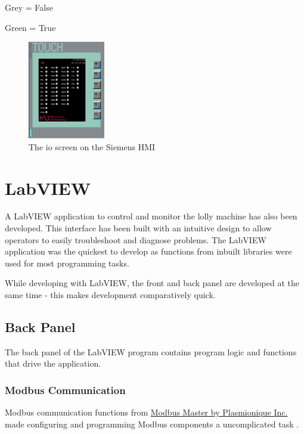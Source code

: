             \begin{description}
                \item Grey = False
                \item Green = True
            \end{description}

        \begin{figure}[H]
            \centering
            \includegraphics[width = 0.3\textwidth]{2_images/hmiIo}
            \caption{The io screen on the Siemens HMI}
            \label{fig:hmiIo}
        \end{figure} 
    
\section{LabVIEW}
    A LabVIEW application to control and monitor the lolly machine has also been developed. This interface has been built with an intuitive design to allow operators to easily troubleshoot and diagnose problems. The LabVIEW application was the quickest to develop as functions from inbuilt libraries were used for most programming tasks.

    While developing with LabVIEW, the front and back panel are developed at the same time - this makes development comparatively quick.
    
    \subsection{Back Panel}
    
        The back panel of the LabVIEW program contains program logic and functions that drive the application. 
        
        \subsubsection{Modbus Communication}
        
            Modbus communication functions from \href{https://www.ni.com/en-au/support/downloads/tools-network/download.modbus-master.html#374378}{Modbus Master by Plasmionique Inc.} made configuring and programming Modbus components a uncomplicated task \cite{modbusLabview}.
            
